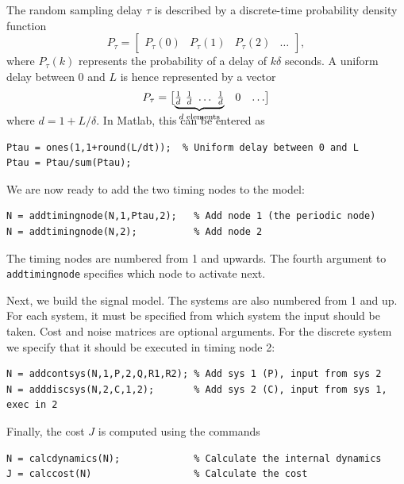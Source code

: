 \documentclass[final,twoside]{rapport}  %
\begin{document}
The random sampling delay $\tau$ is described by a
discrete-time probability density function
\begin{equation*}
P_\tau = \begin{bmatrix} P_\tau(0) & P_\tau(1) & P_\tau(2) & \ldots
\end{bmatrix},
\end{equation*}
where $P_\tau(k)$ represents the probability of a delay of
$k\delta$ seconds. A uniform delay between 0 and $L$ is hence
represented by a vector
\[
P_\tau = \begin{bmatrix}\smash{\underbrace{\tfrac{1}{d} \   \tfrac{1}{d} \
    \ldots \ 
  \tfrac{1}{d}}_{d \text{ elements}}} & 0 & \ldots \end{bmatrix}
\bigskip
\] 
where $d = 1+ L/\delta$. In Matlab, this can be entered as
\begin{small}
\begin{verbatim}
Ptau = ones(1,1+round(L/dt));  % Uniform delay between 0 and L
Ptau = Ptau/sum(Ptau);
\end{verbatim}
\end{small}
We are now ready to add the two timing nodes to the model:
\begin{small}
\begin{verbatim}
N = addtimingnode(N,1,Ptau,2);   % Add node 1 (the periodic node)
N = addtimingnode(N,2);          % Add node 2
\end{verbatim}
\end{small}
The timing nodes are numbered from 1 and upwards. The fourth argument
to {\tt addtimingnode} specifies which node to activate next.

Next, we build the signal model. The systems are also numbered
from 1 and up. For each system, it must be specified from which system
the input should be taken. Cost and noise matrices are optional
arguments. For the discrete system we specify that it should be executed in timing node 2:
\begin{small}
\begin{verbatim}
N = addcontsys(N,1,P,2,Q,R1,R2); % Add sys 1 (P), input from sys 2
N = adddiscsys(N,2,C,1,2);       % Add sys 2 (C), input from sys 1, exec in 2 
\end{verbatim}
\end{small}
Finally, the cost $J$ is computed using the commands
\begin{small}
\begin{verbatim}
N = calcdynamics(N);             % Calculate the internal dynamics
J = calccost(N)                  % Calculate the cost
\end{verbatim}
\end{small}
\end{document}
